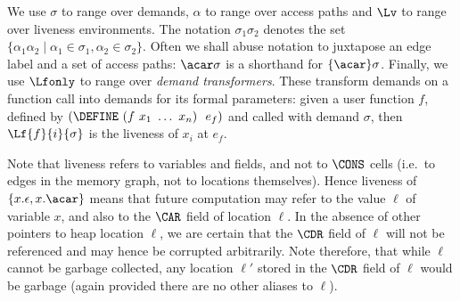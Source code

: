 \documentclass{llncs}
\newcommand{\comment}[1]{{\color{Myblue}{\medskip \hrule\medskip
    #1 \medskip \hrule \medskip}}}
\begin{document}
We use $\sigma$ to range over demands, $\alpha$ to range over access paths
and $\Lv$ to range over liveness environments. The notation
$\sigma_1\sigma_2$ denotes the set $\lbrace \alpha_1\alpha_2 \mid
\alpha_1 \in \sigma_1, \alpha_2 \in \sigma_2\rbrace$. Often we shall
abuse notation to juxtapose an edge label and a set of access paths:
$\acar\sigma$ is a shorthand for $\lbrace\acar\rbrace\sigma$.
Finally, we use $\Lfonly$ to range over {\em demand transformers}.
These transform demands on a function call
into demands for its formal parameters:
given a user function $f$, defined by
$(\DEFINE\ (f\ x_1\ \ldots\ x_n)\ \ e_f)$ and called with demand $\sigma$,
then $\Lf{f}{i}{\sigma}$ is the liveness of $x_i$ at $e_f$.

Note that liveness refers to variables and fields, and not to $\CONS$ cells
(i.e.\ to edges in the memory graph, not to locations themselves).
Hence liveness of $\{x.\epsilon,x.\acar\}$ means that future computation
may refer to the value $\ell$ of variable $x$, and also to the $\CAR$ field
of location $\ell$.
In the absence of other pointers to heap location $\ell$, we are
certain that the $\CDR$ field of $\ell$ will not be referenced
and may hence be corrupted arbitrarily.
Note therefore, that while  $\ell$ cannot be garbage collected, any
location $\ell'$ stored in the $\CDR$ field of $\ell$ would be garbage
(again provided there are no other aliases to  $\ell$).



\end{document}
